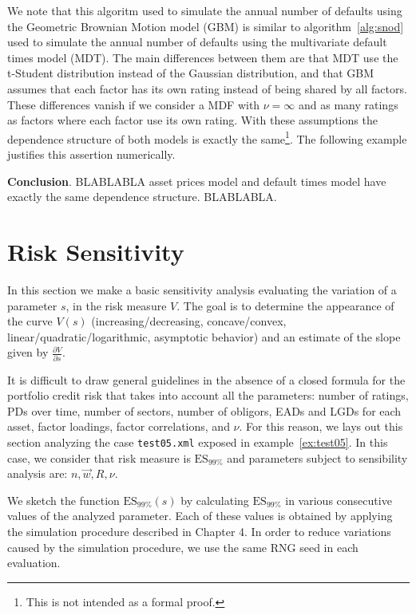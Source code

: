 \documentclass[11pt,fleqn]{book} %
\begin{document}
We note that this algoritm used to simulate the annual number of defaults using 
the Geometric Brownian Motion model (GBM) is similar to algorithm~\ref{alg:snod} 
used to simulate the annual number of defaults using the multivariate default 
times model (MDT). The main differences between them are that MDT use the 
t-Student distribution instead of the Gaussian distribution, and that GBM 
assumes that each factor has its own rating instead of being shared by all 
factors. These differences vanish if we consider a MDF with $\nu=\infty$ and 
as many ratings as factors where each factor use its own rating. With these
assumptions the dependence structure of both models is exactly the 
same\footnote{ This is not intended as a formal proof.}. The following example 
justifies this assertion numerically.


\textbf{Conclusion}. BLABLABLA asset prices model and default times model
have exactly the same dependence structure. BLABLABLA.

\section{Risk Sensitivity}

In this section we make a basic sensitivity analysis evaluating the variation 
of a parameter $s$, in the risk measure $V$. The goal is to determine the 
appearance of the curve $V(s)$ (increasing/decreasing, concave/convex, 
linear/quadratic/logarithmic, asymptotic behavior) and an estimate of the 
slope given by $\frac{\partial V}{\partial s}$.

It is difficult to draw general guidelines in the absence of a closed formula 
for the portfolio credit risk that takes into account all the parameters: 
number of ratings, PDs over time, number of sectors, number of obligors, EADs 
and LGDs for each asset, factor loadings, factor correlations, and $\nu$. For 
this reason, we lays out this section analyzing the case \texttt{test05.xml} 
exposed in example~\ref{ex:test05}. In this case, we consider that risk 
measure is $\text{ES}_{99\%}$ and parameters subject to sensibility analysis 
are: $n, \vec{w}, R, \nu$.

We sketch the function $\text{ES}_{99\%}(s)$ by calculating $\text{ES}_{99\%}$ 
in various consecutive values of the analyzed parameter. Each of these values 
is obtained by applying the simulation procedure described in Chapter 4. 
In order to reduce variations caused by the simulation procedure, we use the 
same RNG seed in each evaluation.
\end{document}
